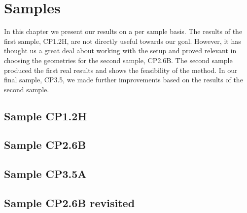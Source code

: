 \chapter{Samples}
In this chapter we present our results on a per sample basis. The results of the first sample, CP1.2H, are not directly useful towards our goal. However, it has thought us a great deal about working with the setup and proved relevant in choosing the geometries for the second sample, CP2.6B. The second sample produced the first real results and shows the feasibility of the method. In our final sample, CP3.5, we made further improvements based on the results of the second sample.

\section{Sample CP1.2H}


\section{Sample CP2.6B}


\section{Sample CP3.5A}


\section{Sample CP2.6B revisited}
